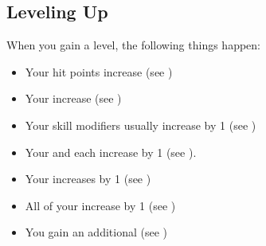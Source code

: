     \subsection{Leveling Up}
        When you gain a level, the following things happen:
        \begin{itemize}
            \item Your hit points increase (see )
            \item Your  increase (see )
            \item Your skill modifiers usually increase by 1 (see )
            \item Your  and  each increase by 1 (see ).
            \item Your  increases by 1 (see )
            \item All of your  increase by 1 (see )
            \item You gain an additional  (see )
        \end{itemize}
